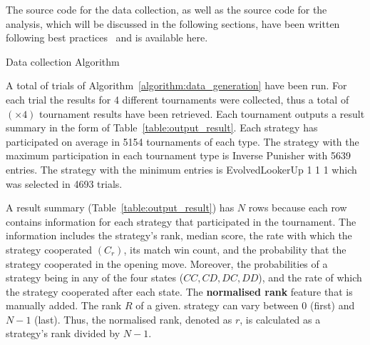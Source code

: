 \documentclass{article}
\newcommand{\uniquenumberofseeds}{}
\newcommand{\numberofalltournaments}{}
\begin{document}
The source code for the data collection, as well as the source code for
the analysis, which will be discussed in the following sections, have been written
following best practices~\cite{Aberdour2007, Benureau2018}
and is available here. %

\begin{algorithm}[!htbp]
    \;
    \caption{Data collection Algorithm}
    \label{algorithm:data_generation}
\end{algorithm}

A total of \uniquenumberofseeds trials of Algorithm~\ref{algorithm:data_generation} have been
run. For each trial the results for 4 different tournaments were collected,
thus a total of \numberofalltournaments $(\uniquenumberofseeds \times 4)$ tournament results have been
retrieved. Each tournament outputs a result summary in the form of
Table~\ref{table:output_result}. Each strategy has participated on average in
5154 tournaments of each type. The strategy with the maximum participation in each
tournament type is Inverse Punisher with 5639 entries. The strategy with the
minimum entries is EvolvedLookerUp 1 1 1 which was selected in 4693 trials.

A result summary (Table~\ref{table:output_result}) has \(N\) rows
because each row contains information for each strategy that participated in the
tournament. The information includes the strategy's rank, median score, the rate
with which the strategy cooperated $(C_r)$, its match win count, and the
probability that the strategy cooperated in the opening move. Moreover, the
probabilities of a strategy being in any of the four states ($CC, CD, DC, DD$),
and the rate of which the strategy cooperated after each state. The \textbf{normalised rank}
feature that is manually added. The rank \(R\) of a given.
strategy can vary between 0 (first) and \(N-1\) (last). Thus, the normalised rank,
denoted as $r$, is calculated as a strategy's rank divided by \(N - 1\).
\end{document}
